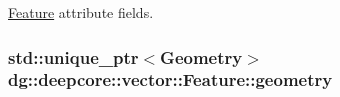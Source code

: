 \hyperlink{classdg_1_1deepcore_1_1vector_1_1_feature}{Feature} attribute fields. 

\subsubsection[{\texorpdfstring{geometry}{geometry}}]{\setlength{\rightskip}{0pt plus 5cm}std\+::unique\+\_\+ptr$<${\bf Geometry}$>$ dg\+::deepcore\+::vector\+::\+Feature\+::geometry}\hypertarget{classdg_1_1deepcore_1_1vector_1_1_feature_af5ba964b4c660e021e4e99e1752462b4}{}\label{classdg_1_1deepcore_1_1vector_1_1_feature_af5ba964b4c660e021e4e99e1752462b4}
